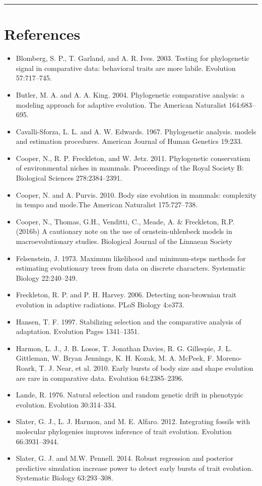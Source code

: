 \documentclass[]{book}
\providecommand{\tightlist}{%
  \setlength{\itemsep}{0pt}\setlength{\parskip}{0pt}}
\theoremstyle{definition}
\theoremstyle{definition}
\theoremstyle{definition}
\theoremstyle{remark}
\begin{document}
\begin{center}\rule{0.5\linewidth}{\linethickness}\end{center}

\section{References}\label{references-2}

\begin{itemize}
\tightlist
\item
  Blomberg, S. P., T. Garland, and A. R. Ives. 2003. Testing for
  phylogenetic signal in comparative data: behavioral traits are more
  labile. Evolution 57:717--745.
\item
  Butler, M. A. and A. A. King. 2004. Phylogenetic comparative analysis:
  a modeling approach for adaptive evolution. The American Naturalist
  164:683--695.
\item
  Cavalli-Sforza, L. L. and A. W. Edwards. 1967. Phylogenetic analysis.
  models and estimation procedures. American Journal of Human Genetics
  19:233.
\item
  Cooper, N., R. P. Freckleton, and W. Jetz. 2011. Phylogenetic
  conservatism of environmental niches in mammals. Proceedings of the
  Royal Society B: Biological Sciences 278:2384--2391.
\item
  Cooper, N. and A. Purvis. 2010. Body size evolution in mammals:
  complexity in tempo and mode.The American Naturalist 175:727--738.
\item
  Cooper, N., Thomas, G.H., Venditti, C., Meade, A. \& Freckleton, R.P.
  (2016b) A cautionary note on the use of ornstein-uhlenbeck models in
  macroevolutionary studies. Biological Journal of the Linnaean Society
\item
  Felsenstein, J. 1973. Maximum likelihood and minimum-steps methods for
  estimating evolutionary trees from data on discrete characters.
  Systematic Biology 22:240--249.
\item
  Freckleton, R. P. and P. H. Harvey. 2006. Detecting non-brownian trait
  evolution in adaptive radiations. PLoS Biology 4:e373.
\item
  Hansen, T. F. 1997. Stabilizing selection and the comparative analysis
  of adaptation. Evolution Pages 1341--1351.
\item
  Harmon, L. J., J. B. Losos, T. Jonathan Davies, R. G. Gillespie, J. L.
  Gittleman, W. Bryan Jennings, K. H. Kozak, M. A. McPeek, F.
  Moreno-Roark, T. J. Near, et al. 2010. Early bursts of body size and
  shape evolution are rare in comparative data. Evolution 64:2385--2396.
\item
  Lande, R. 1976. Natural selection and random genetic drift in
  phenotypic evolution. Evolution 30:314--334.
\item
  Slater, G. J., L. J. Harmon, and M. E. Alfaro. 2012. Integrating
  fossils with molecular phylogenies improves inference of trait
  evolution. Evolution 66:3931--3944.
\item
  Slater, G. J. and M.W. Pennell. 2014. Robust regression and posterior
  predictive simulation increase power to detect early bursts of trait
  evolution. Systematic Biology 63:293--308.
\end{itemize}
\end{document}
